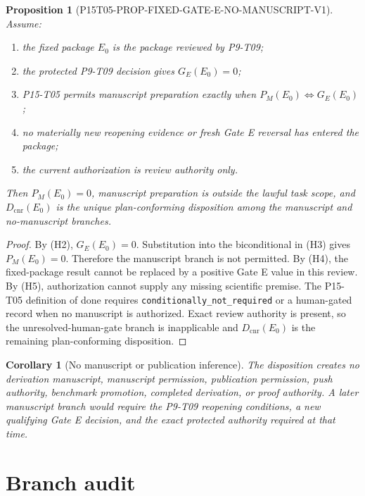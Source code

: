 \documentclass[11pt]{article}
\newtheorem{proposition}{Proposition}
\newtheorem{corollary}{Corollary}
\begin{document}
\begin{proposition}[P15T05-PROP-FIXED-GATE-E-NO-MANUSCRIPT-V1]
Assume:
\begin{enumerate}[label=(H\arabic*)]
  \item the fixed package $E_0$ is the package reviewed by P9-T09;
  \item the protected P9-T09 decision gives $G_E(E_0)=0$;
  \item P15-T05 permits manuscript preparation exactly when
  $P_M(E_0)\Longleftrightarrow G_E(E_0)$;
  \item no materially new reopening evidence or fresh Gate E reversal has
  entered the package;
  \item the current authorization is review authority only.
\end{enumerate}
Then $P_M(E_0)=0$, manuscript preparation is outside the lawful task scope,
and $D_{\mathrm{cnr}}(E_0)$ is the unique plan-conforming disposition among
the manuscript and no-manuscript branches.
\end{proposition}

\begin{proof}
By (H2), $G_E(E_0)=0$.  Substitution into the biconditional in (H3) gives
$P_M(E_0)=0$.  Therefore the manuscript branch is not permitted.  By (H4),
the fixed-package result cannot be replaced by a positive Gate E value in this
review.  By (H5), authorization cannot supply any missing scientific premise.
The P15-T05 definition of done requires \texttt{conditionally\_not\_required}
or a human-gated record when no manuscript is authorized.  Exact review
authority is present, so the unresolved-human-gate branch is inapplicable and
$D_{\mathrm{cnr}}(E_0)$ is the remaining plan-conforming disposition.
\end{proof}

\begin{corollary}[No manuscript or publication inference]
The disposition creates no derivation manuscript, manuscript permission,
publication permission, push authority, benchmark promotion, completed
derivation, or proof authority.  A later manuscript branch would require the
P9-T09 reopening conditions, a new qualifying Gate E decision, and the exact
protected authority required at that time.
\end{corollary}

\section{Branch audit}
\end{document}
